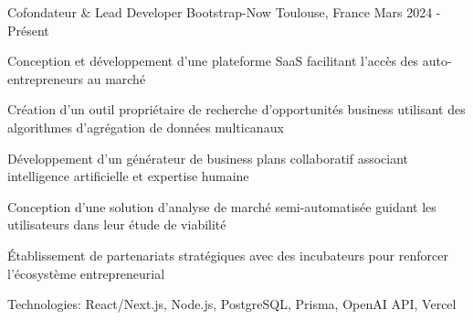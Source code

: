 \begin{cventries}
\cventry
{Cofondateur \& Lead Developer} %
{Bootstrap-Now} %
{Toulouse, France} %
{Mars 2024 - Présent} %
{ %
\begin{cvitems}
\item {Conception et développement d'une plateforme SaaS facilitant l'accès des auto-entrepreneurs au marché}
\item {Création d'un outil propriétaire de recherche d'opportunités business utilisant des algorithmes d'agrégation de données multicanaux}
\item {Développement d'un générateur de business plans collaboratif associant intelligence artificielle et expertise humaine}
\item {Conception d'une solution d'analyse de marché semi-automatisée guidant les utilisateurs dans leur étude de viabilité}
\item {Établissement de partenariats stratégiques avec des incubateurs pour renforcer l'écosystème entrepreneurial}
\item {Technologies: React/Next.js, Node.js, PostgreSQL, Prisma, OpenAI API, Vercel}
\end{cvitems}
}
\vspace{1.5em}



\end{cventries}
